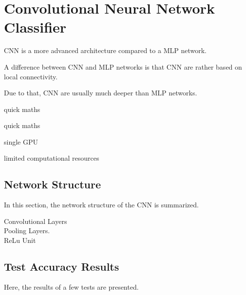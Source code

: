 \section{Convolutional Neural Network Classifier} \label{sec:CNN}
	\pagestyle{mario}

CNN is a more advanced architecture compared to a MLP network.


A difference between CNN and MLP networks is that CNN are rather based on local connectivity.

Due to that, CNN are usually much deeper than MLP networks.

quick maths

quick maths

single GPU

limited computational resources
	
\subsection{Network Structure}

In this section, the network structure of the CNN is summarized.

Convolutional Layers\\

Pooling Layers.\\

ReLu Unit\\

\subsection{Test Accuracy Results}

Here, the results of a few tests are presented.



    
